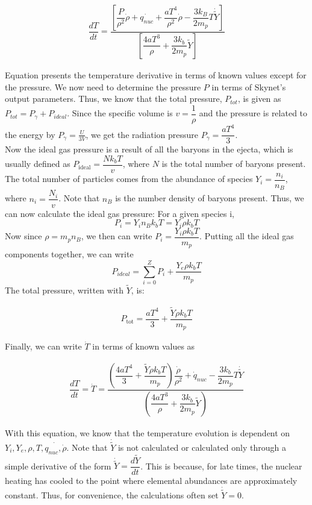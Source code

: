 \documentclass[11pt,a4paper]{article}
\begin{document}
\begin{align}
	\dfrac{dT}{dt} = \dfrac{[ \dfrac{P}{\rho^2} \dot{\rho} + \dot{q_{nuc}} + \dfrac{aT^4}{\rho^2} \dot{\rho} - \dfrac{3 k_B}{2 m_p} T \dot{\tilde{Y}}]} {[\dfrac{4a T^3}{\rho} + \dfrac{3 k_b}{2 m_p} \tilde{Y}]}
\end{align}

Equation presents the temperature derivative in terms of known values except for the pressure. We now need to determine the pressure $P$ in terms of Skynet's output parameters. Thus, we know that the total pressure, $P_{tot}$, is given as $P_{tot} = P_{\gamma} + P_{ideal}$. Since the specific volume is $v = \dfrac{1}{\rho}$ and the pressure is related to the energy by $P_\gamma = \frac{U}{3V}$,  we get the radiation pressure $P_{\gamma} = \dfrac{a T^4}{3}$.\\
Now the ideal gas pressure is a result of all the baryons in the ejecta, which is usually defined as $P_\mathrm{ideal} = \dfrac{N k_b T}{v}$, where $N$ is the total number of baryons present. The total number of particles comes from the abundance of species $Y_i = \dfrac{n_i}{n_B}$, where $n_i = \dfrac{N_i}{v}$. Note that $n_B$ is the number density of baryons present. Thus, we can now calculate the ideal gas pressure: For a given species i,
$$ P_i = Y_i n_B k_b T  = Y_i \rho k_b T$$ Now since $\rho = m_p n_B$, we then can write $P_i = \dfrac{Y_i \rho k_b T}{m_p}$. Putting all the ideal gas components together, we can write 
$$ P_{ideal} = \sum_{i=0}^{Z} P_i + \dfrac{Y_e \rho k_b T}{m_p} $$ The total pressure, written with $\tilde{Y}$, is:

\begin{align}
	P_\mathrm{tot} = \dfrac{a T^4}{3} + \dfrac{\tilde{Y} \rho k_b T}{m_p}
\end{align} 

Finally, we can write $\dot{T}$ in terms of known values as 

\begin{align}
	\dfrac{dT}{dt} = \dot{T} = \dfrac{ \left(\dfrac{4 a T^4}{3} + \dfrac{\tilde{Y} \rho k_b T}{m_p} \right) \dfrac{\dot{\rho}}{\rho ^2} + \dot{q}_{nuc} - \dfrac{3 k_b}{2 m_p} T \dot{\tilde{Y}}} { \left( \dfrac{4a T^3}{\rho}  + \dfrac{3 k_b}{2 m_p} \tilde{Y} \right)}
\end{align}

With this equation, we know that the temperature evolution is dependent on $Y_i, Y_e, \rho, T, \dot{q_{nuc}, \dot{\rho}}$. Note that $\dot{\tilde{Y}}$ is not calculated or calculated only through a simple derivative of the form $\dot{\tilde{Y}} = \dfrac{d \tilde{Y}} {dt} $. This is because, for late times, the nuclear heating has cooled to the point where elemental abundances are approximately constant. Thus, for convenience, the calculations often set $\dot{\tilde{Y}} = 0$. \\
\end{document}
